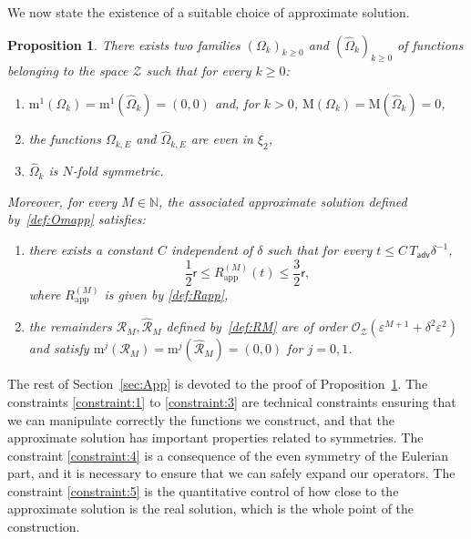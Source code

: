 \documentclass[11pt,reqno,a4paper]{amsart}
\def\eps{\varepsilon}
\def\NN {\mathbb{N}}
\newcommand{\cO}{\mathcal{O}}
\newcommand{\cR}{\mathcal{R}}
\newcommand{\cZ}{\mathcal{Z}}
\newcommand{\adv}{\mathsf{adv}}
\newcommand{\mrm}{\mathrm{m}}
\newcommand{\mrM}{\mathrm{M}}
\newcommand{\1}{\mathbbm{1}}
\newtheorem{proposition}{Proposition}[section]
\theoremstyle{definition}
\theoremstyle{definition}
\numberwithin{equation}{section}
\newcommand{\Mapp}[2]{#1^{(#2)}_\mathrm{app}}
\begin{document}
We now state the existence of a suitable choice of approximate solution.
\begin{proposition}\label{prop:construction}
    There exists two families $(\Omega_k)_{k\ge 0}$ and $(\widehat{\Omega}_k)_{k\ge 0}$ of functions belonging to the space $\cZ$ such that for every $k \ge 0$:
    \begin{enumerate}[label=\textbf{C\arabic*)}]

        \item \label{constraint:1}$\mrm^1(\Omega_k)=\mrm^1(\widehat{\Omega}_k)=(0,0)$ and, for $k>0$, $\mrM(\Omega_k)=\mrM(\widehat{\Omega}_k)=0$,
        \item\label{constraint:2}the functions $\Omega_{k,E}$ and $\widehat{\Omega}_{k,E}$ are 
        even in $\xi_2$,
        \item\label{constraint:3} $\widehat{\Omega}_k$ is $N$-fold symmetric.
    \end{enumerate}
    
        Moreover, for every $M \in \NN$, the associated approximate solution defined by~\cref{def:Omapp} satisfies:
    \begin{enumerate}[label=\textbf{C\arabic*)},resume]
            \item\label{constraint:4}there exists a constant $C$ independent of $\delta$ such that for every $t \le C \, T_\adv\delta^{-1}$,
        $$\frac{1}{2} \mathsf{r} \le \Mapp{R}{M}(t) \le \frac{3}{2} \mathsf{r},$$ where $\Mapp{R}{M}$ is given by \cref{def:Rapp},
        \item\label{constraint:5} the remainders $\cR_{M},\widehat{\cR}_M$ defined by~\cref{def:RM} are of order $\cO_{\cZ}(\eps^{M+1}+\delta^2\eps^2)$ and satisfy $\mrm^j(\cR_M)=\mrm^j(\widehat{\cR}_M)=(0,0)$ for $j=0,1$.
    \end{enumerate}
\end{proposition}
The rest of Section~\ref{sec:App} is devoted to the proof of Proposition~\ref{prop:construction}. The constraints \ref{constraint:1} to \ref{constraint:3} are technical constraints ensuring that we can manipulate correctly the functions we construct, and that the approximate solution has important properties related to symmetries. The constraint \ref{constraint:4} is a consequence of the even symmetry of the Eulerian part, and it is necessary to ensure that we can safely expand our operators. The constraint \ref{constraint:5} is the quantitative control of how close to the approximate solution is  the real solution, which is the whole point of the construction.
\end{document}
